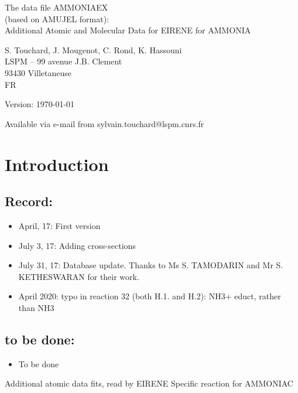\documentclass[12pt,dvipdfm]{article}
\begin{document}
\parindent 0pt
{\Large \bf \center
\vspace*{3truecm}

The data file AMMONIAEX \\(based on AMUJEL format): \\
Additional Atomic and Molecular Data for EIRENE for AMMONIA
\vspace*{3truecm}

S. Touchard, J. Mougenot, C. Rond, K. Hassouni\\
LSPM -- 99 avenue J.B. Clement\\
93430 Villetaneuse \\
FR
\vspace{5truecm}

Version: \today
\vspace{3truecm}

Available via e-mail from sylvain.touchard@lspm.cnrs.fr
}
\tableofcontents
\newpage
\section*{Introduction}

\subsection*{Record:}
\begin{itemize}
\item April, 17:  First version
\item July 3, 17: Adding cross-sections
\item July 31, 17: Database update. Thanks to Ms S. TAMODARIN and Mr S. KETHESWARAN for their work.

\item April 2020:  typo in reaction 32 (both H.1. and H.2):  NH3+ educt, rather than NH3
\end{itemize}

\subsection*{to be done:}
\begin{itemize}
\item  To be done
\end{itemize}


Additional atomic data fits, read by EIRENE
Specific reaction for AMMONIAC
\end{document}
